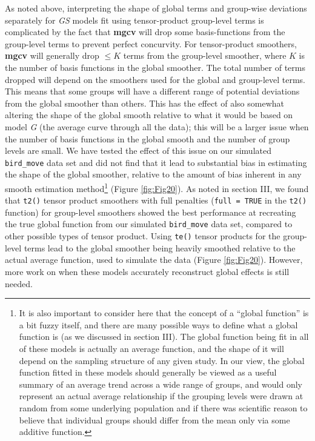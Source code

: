 \documentclass[12pt]{article}
\let\rmarkdownfootnote\footnote%
\def\footnote{\protect\rmarkdownfootnote}
\begin{document}
As noted above, interpreting the shape of global terms and group-wise
deviations separately for \emph{GS} models fit using tensor-product
group-level terms is complicated by the fact that \textbf{mgcv} will
drop some basis-functions from the group-level terms to prevent perfect
concurvity. For tensor-product smoothers, \textbf{mgcv} will generally
drop \(\le K\) terms from the group-level smoother, where \(K\) is the
number of basis functions in the global smoother. The total number of
terms dropped will depend on the smoothers used for the global and
group-level terms. This means that some groups will have a different
range of potential deviations from the global smoother than others. This
has the effect of also somewhat altering the shape of the global smooth
relative to what it would be based on model \emph{G} (the average curve
through all the data); this will be a larger issue when the number of
basis functions in the global smooth and the number of group levels are
small. We have tested the effect of this issue on our simulated
\texttt{bird\_move} data set and did not find that it lead to
substantial bias in estimating the shape of the global smoother,
relative to the amount of bias inherent in any smooth estimation
method\footnote{It is also important to consider here that the concept
  of a ``global function'' is a bit fuzzy itself, and there are many
  possible ways to define what a global function is (as we discussed in
  section III). The global function being fit in all of these models is
  actually an average function, and the shape of it will depend on the
  sampling structure of any given study. In our view, the global
  function fitted in these models should generally be viewed as a useful
  summary of an average trend across a wide range of groups, and would
  only represent an actual average relationship if the grouping levels
  were drawn at random from some underlying population and if there was
  scientific reason to believe that individual groups should differ from
  the mean only via some additive function.} (Figure \ref{fig:Fig20}).
As noted in section III, we found that \texttt{t2()} tensor product
smoothers with full penalties (\texttt{full\ =\ TRUE} in the
\texttt{t2()} function) for group-level smoothers showed the best
performance at recreating the true global function from our simulated
\texttt{bird\_move} data set, compared to other possible types of tensor
product. Using \texttt{te()} tensor products for the group-level terms
lead to the global smoother being heavily smoothed relative to the
actual average function, used to simulate the data (Figure
\ref{fig:Fig20}). However, more work on when these models accurately
reconstruct global effects is still needed.
\end{document}
